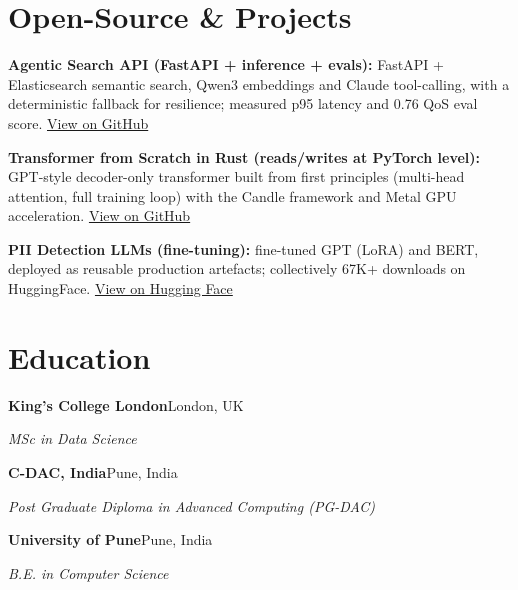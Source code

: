 \documentclass[10pt,a4paper]{article}
\begin{document}
\section{Open-Source \& Projects}
\begin{tight}
  \item \textbf{Agentic Search API (FastAPI + inference + evals):} FastAPI + Elasticsearch semantic search, Qwen3 embeddings and Claude tool-calling, with a deterministic fallback for resilience; measured p95 latency and 0.76 QoS eval score. \href{https://github.com/abhijeetscode/search-agent}{View on GitHub}
  \item \textbf{Transformer from Scratch in Rust (reads/writes at PyTorch level):} GPT-style decoder-only transformer built from first principles (multi-head attention, full training loop) with the Candle framework and Metal GPU acceleration. \href{https://github.com/abhijeetscode/transformer-rust}{View on GitHub}
  \item \textbf{PII Detection LLMs (fine-tuning):} fine-tuned GPT (LoRA) and BERT, deployed as reusable production artefacts; collectively 67K+ downloads on HuggingFace. \href{https://huggingface.co/ab-ai/pii_model}{View on Hugging Face}
\end{tight}

\section{Education}
{\color{company}\bfseries King's College London}\hfill {\color{muted}London, UK}\par
{\itshape MSc in Data Science}\par\vspace{2pt}
{\color{company}\bfseries C-DAC, India}\hfill {\color{muted}Pune, India}\par
{\itshape Post Graduate Diploma in Advanced Computing (PG-DAC)}\par\vspace{2pt}
{\color{company}\bfseries University of Pune}\hfill {\color{muted}Pune, India}\par
{\itshape B.E. in Computer Science}\par
\end{document}
